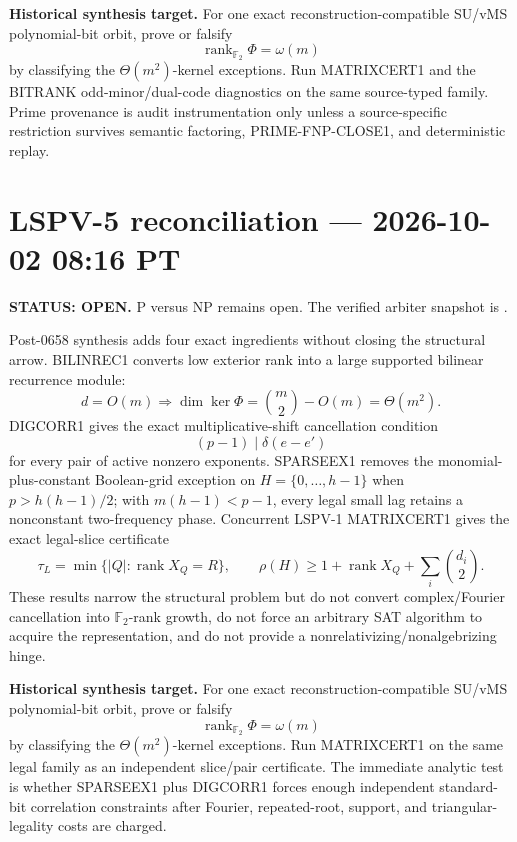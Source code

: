 \documentclass[11pt]{article}
\begin{document}
\begin{candidatebox}
\textbf{Historical synthesis target.}
For one exact reconstruction-compatible SU/vMS polynomial-bit orbit, prove or falsify
\[
\operatorname{rank}_{\mathbb F_2}\Phi=\omega(m)
\]
by classifying the \(\Theta(m^2)\)-kernel exceptions. Run MATRIXCERT1 and the BITRANK
odd-minor/dual-code diagnostics on the same source-typed family. Prime provenance is audit
instrumentation only unless a source-specific restriction survives semantic factoring,
PRIME-FNP-CLOSE1, and deterministic replay.
\end{candidatebox}


\section{LSPV-5 reconciliation --- 2026-10-02 08:16 PT}
\textbf{STATUS: OPEN.} P versus NP remains open. The verified arbiter snapshot is
.

Post-0658 synthesis adds four exact ingredients without closing the structural arrow.
BILINREC1 converts low exterior rank into a large supported bilinear recurrence module:
\[
d=O(m)\Longrightarrow \dim\ker\Phi=\binom m2-O(m)=\Theta(m^2).
\]
DIGCORR1 gives the exact multiplicative-shift cancellation condition
\[
(p-1)\mid\delta(e-e')
\]
for every pair of active nonzero exponents. SPARSEEX1 removes the monomial-plus-constant
Boolean-grid exception on \(H=\{0,\ldots,h-1\}\) when \(p>h(h-1)/2\); with
\(m(h-1)<p-1\), every legal small lag retains a nonconstant two-frequency phase.
Concurrent LSPV-1 MATRIXCERT1 gives the exact legal-slice certificate
\[
\tau_L=\min\{|Q|:\operatorname{rank}X_Q=R\},\qquad
\rho(H)\ge1+\operatorname{rank}X_Q+\sum_i\binom{d_i}{2}.
\]
These results narrow the structural problem but do not convert complex/Fourier cancellation into
\(\mathbb F_2\)-rank growth, do not force an arbitrary SAT algorithm to acquire the representation,
and do not provide a nonrelativizing/nonalgebrizing hinge.

\begin{candidatebox}
\textbf{Historical synthesis target.}
For one exact reconstruction-compatible SU/vMS polynomial-bit orbit, prove or falsify
\[
\operatorname{rank}_{\mathbb F_2}\Phi=\omega(m)
\]
by classifying the \(\Theta(m^2)\)-kernel exceptions. Run MATRIXCERT1 on the same legal family as an
independent slice/pair certificate. The immediate analytic test is whether SPARSEEX1 plus DIGCORR1
forces enough independent standard-bit correlation constraints after Fourier, repeated-root,
support, and triangular-legality costs are charged.
\end{candidatebox}
\end{document}
